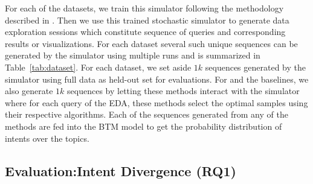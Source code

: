 %
%
For each of the datasets, we train this simulator following the methodology described in \cite{atena2020sigmod}.
Then we use this trained stochastic simulator to generate data exploration sessions which constitute sequence of queries and corresponding results or visualizations. 
For each dataset several such unique sequences can be generated by the simulator using multiple runs and is summarized in Table~\ref{tab:dataset}.
For each dataset, we set aside $1k$ sequences generated by the simulator using full data as held-out set for evaluations.
For \name and the baselines, we also generate $1k$ sequences by letting these methods interact with the simulator where for each query of the EDA, these methods select the optimal samples using their respective algorithms. 
%
Each of the sequences generated from any of the methods are fed into the BTM model to get the probability distribution of intents over the topics.


\subsection{Evaluation:Intent Divergence (RQ1)}
\label{sec:eval_intent}

